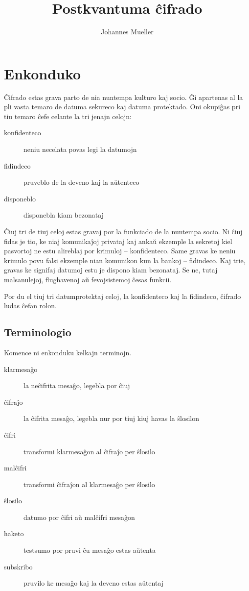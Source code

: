 \documentclass[utf8]{scrartcl}
\title{Postkvantuma ĉifrado}
\author{Johannes Mueller}
\date{}
\begin{document}
\maketitle

\section{Enkonduko}

Ĉifrado estas grava parto de nia nuntempa kulturo kaj socio.  Ĝi apartenas al
la pli vasta temaro de datuma sekureco kaj datuma protektado.  Oni okupiĝas pri
tiu temaro ĉefe celante la tri jenajn celojn:
%
\begin{description}
\item[konfidenteco] neniu necelata povas legi la datumojn
\item[fidindeco] pruveblo de la deveno kaj la aŭtenteco
\item[disponeblo] disponebla kiam bezonataj
\end{description}

Ĉiuj tri de tiuj celoj estas gravaj por la funkciado de la nuntempa socio.  Ni
ĉiuj fidas je tio, ke niaj komunikaĵoj privataj kaj ankaŭ ekzemple la sekretoj
kiel pasvortoj ne estu alireblaj por krimuloj – konfidenteco. Same gravas ke
neniu krimulo povu falsi ekzemple nian komunikon kun la bankoj – fidindeco.
Kaj trie, gravas ke signifaj datumoj estu je dispono kiam bezonataj. Se ne, tutaj
malsanulejoj, flughavenoj aŭ fevojsistemoj ĉesas funkcii.

Por du el tiuj tri datumprotektaj celoj, la konfidenteco kaj la fidindeco,
ĉifrado ludas ĉefan rolon.

\subsection{Terminologio}

Komence ni enkonduku kelkajn terminojn.
%
\begin{description}
\item[klarmesaĝo] la neĉifrita mesaĝo, legebla por ĉiuj
\item[ĉifraĵo] la ĉifrita mesaĝo, legebla nur por tiuj kiuj havas la ŝlosilon
\item[ĉifri] transformi klarmesaĝon al ĉifraĵo per ŝlosilo
\item[malĉifri] transformi ĉifraĵon al klarmesaĝo per ŝlosilo
\item[ŝlosilo] datumo por ĉifri aŭ malĉifri mesaĝon
\item[haketo] testsumo por pruvi ĉu mesaĝo estas aŭtenta
\item[subskribo] pruvilo ke mesaĝo kaj la deveno estas aŭtentaj
\end{description}
\end{document}
